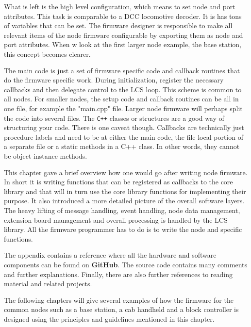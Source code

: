 What is left is the high level configuration, which means to set node and port attributes. This task is comparable to a DCC locomotive decoder. It is has tons of variables  that can be set. The firmware designer is responsible to make all relevant items of the node firmware configurable by exporting them as node and port attributes. When w look at the first larger node example, the base station, this concept becomes clearer.


The main code is just a set of firmware specific code and callback routines that do the firmware specific work. During initialization, register the necessary callbacks and then delegate control to the LCS loop. This scheme is common to all nodes. For smaller nodes, the setup code and callback routines can be all in one file, for example the "main.cpp" file. Larger node firmware will perhaps split the code into several files. The \texttt{C++} classes or structures are a good way of structuring your code. There is one caveat though. Callbacks are technically just procedure labels and need to be at either the main code, the file local portion of a separate file or a static methods in a C++ class. In other words, they cannot be object instance methods.


This chapter gave a brief overview how one would go after writing node firmware. In short it is writing functions that can be registered as callbacks to the core library and that will in turn use the core library functions for implementing their purpose. It also introduced a more detailed picture of the overall software layers. The heavy lifting of message handling, event handling, node data management, extension board management and overall processing is handled by the LCS library. All the firmware programmer has to do is to write the node and specific functions. 

The appendix contains a reference where all the hardware and software components can be found on \textbf{GitHub}. The source code contains many comments and further explanations. Finally, there are also further references to reading material and related projects.

The following chapters will give several examples of how the firmware for the common nodes such as a base station, a cab handheld and a block controller is designed using the principles and guidelines mentioned in this chapter.

